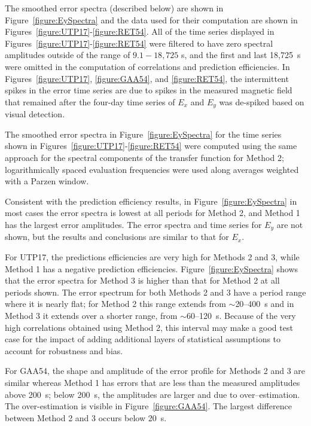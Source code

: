 \documentclass[linenumbers,draft]{agujournal}
\begin{document}
The smoothed error spectra (described below) are shown in Figure~\ref{figure:EySpectra} and the data used for their computation are shown in Figures~\ref{figure:UTP17}-\ref{figure:RET54}.  All of the time series displayed in Figures~\ref{figure:UTP17}-\ref{figure:RET54} were filtered to have zero spectral amplitudes outside of the range of $9.1-18,725$ s, and the first and last 18,725~s were omitted in the computation of correlations and prediction efficiencies.  In Figures~\ref{figure:UTP17}, \ref{figure:GAA54}, and \ref{figure:RET54}, the intermittent spikes in the error time series are due to spikes in the measured magnetic field that remained after the four-day time series of $E_x$ and $E_y$ was de-spiked based on visual detection. 

The smoothed error spectra in Figure~\ref{figure:EySpectra} for the time series shown in Figures~\ref{figure:UTP17}-\ref{figure:RET54} were computed using the same approach for the spectral components of the transfer function for Method 2; logarithmically spaced evaluation frequencies were used along averages weighted with a Parzen window.


Consistent with the prediction efficiency results, in Figure~\ref{figure:EySpectra} in most cases the error spectra is lowest at all periods for Method 2, and Method 1 has the largest error amplitudes. The error spectra and time series for $E_y$ are not shown, but the results and conclusions are similar to that for $E_x$. 

For UTP17, the predictions efficiencies are very high for Methods 2 and 3, while Method 1 has a negative prediction efficiencies.  Figure~\ref{figure:EySpectra} shows that the error spectra for Method 3 is higher than that for Method 2 at all periods shown.  The error spectrum for both Methods 2 and 3 have a period range where it is nearly flat; for Method 2 this range extends from $\sim$20--400~s and in Method 3 it extends over a shorter range, from $\sim$60--120~s.  Because of the very high correlations obtained using Method 2, this interval may make a good test case for the impact of adding additional layers of statistical assumptions to account for robustness and bias.

For GAA54, the shape and amplitude of the error profile for Methods 2 and 3 are similar whereas Method 1 has errors that are less than the measured amplitudes above 200~s; below 200~s, the amplitudes are larger and due to over--estimation.  The over-estimation is visible in Figure~\ref{figure:GAA54}.  The largest difference between Method 2 and 3 occurs below 20~s.
\end{document}
